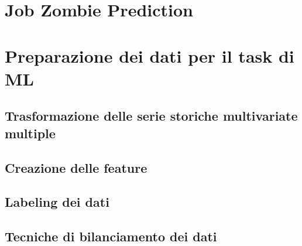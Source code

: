 \section{Job Zombie Prediction}





\section{Preparazione dei dati per il task di ML}
\subsection{Trasformazione delle serie storiche multivariate multiple}





\subsection{Creazione delle feature}




\subsection{Labeling dei dati}
\subsection{Tecniche di bilanciamento dei dati}




